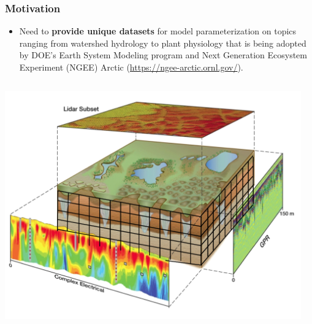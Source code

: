 \documentclass{beamer}
\begin{document}
\begin{frame}
  \frametitle{Motivation}
  \begin{itemize}
  \footnotesize
   \item Need to \textbf{provide unique datasets} for model parameterization on 
topics ranging from watershed hydrology to plant physiology that is being 
adopted by DOE's Earth System Modeling program and​ Next​ 
Generation​ Ecosystem​ Experiment​ (NGEE)​ Arctic 
(\url{https://ngee-arctic.ornl.gov/}).
  \end{itemize}

    \begin{columns}[T]
    \begin{column}{.5\textwidth}
     
   
   \centering
   \vspace{-0.2cm}
   \includegraphics[width=1.0\textwidth]{figs/studyingperm.jpg}

    \end{column}
    \begin{column}{.5\textwidth}
    \vspace{-0.2cm}
    

\end{column}
\end{columns}
\end{frame}
\end{document}
